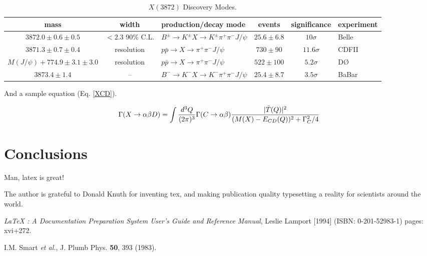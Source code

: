 \documentclass[aps,floatfix,prd,showpacs]{revtex4}
\begin{document}
\begin{table}[ht]
\caption{$X(3872)$ Discovery Modes.}
\label{XmodesTab}
\begin{tabular}{cclccl}
\hline
mass & width & production/decay mode & events & significance & experiment\\
\hline
\hline
$3872.0 \pm 0.6 \pm 0.5$  & $< 2.3$ 90\% C.L.  & $B^\pm \to K^\pm X \to K^\pm \pi^+ \pi^- J/\psi$   &  $25.6 \pm 6.8$ & $10 \sigma$     & Belle\\
$3871.3 \pm 0.7 \pm 0.4$  & resolution & $p\bar p \to  X \to \pi^+ \pi^- J/\psi$   &  $730 \pm 90$ & $11.6 \sigma$  & CDFII\\
$M(J/\psi) + 774.9 \pm 3.1 \pm 3.0$ & resolution & $p\bar p \to X \to \pi^+\pi^-J/\psi$ & $522 \pm 100$ & $5.2 \sigma$  & D{\O} \\
$3873.4 \pm 1.4$  &  --  & $B^- \to K^- X \to K^- \pi^+ \pi^- J/\psi$   &  $25.4 \pm 8.7$ &$3.5 \sigma$ & BaBar\\
\hline
\hline
\end{tabular}
\end{table}

And a sample equation (Eq. \ref{XCD}).

\begin{equation}
\Gamma(X \to \alpha\beta D) = \int {d^3Q\over (2\pi)^3}  \Gamma(C\to \alpha\beta) {|\tilde T(Q)|^2 \over
(M(X) - E_{CD}(Q))^2 + \Gamma_C^2/4}
\label{XCD}
\end{equation}





\section{Conclusions}

Man, latex is great!

\acknowledgments
The author is grateful to Donald Knuth for inventing tex, and making publication quality typesetting a reality for scientists around the world.


\begin{thebibliography}{99}

 {\sl LaTeX : A Documentation Preparation System User's Guide and Reference Manual}, Leslie Lamport [1994] (ISBN: 0-201-52983-1) pages: xvi+272.

I.M. Smart {\it et al.}, J. Plumb Phys. {\bf 50}, 393 (1983).

\end{thebibliography}
\end{document}
